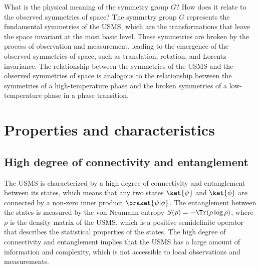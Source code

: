     \begin{tcolorbox}[colback=green!5!white,colframe=green!75!black,title=Question]
        What is the physical meaning of the symmetry group $G$? How does it relate to the observed symmetries of space?
        \tcblower
        The symmetry group $G$ represents the fundamental symmetries of the USMS, which are the transformations that leave the space invariant at the most basic level. These symmetries are broken by the process of observation and measurement, leading to the emergence of the observed symmetries of space, such as translation, rotation, and Lorentz invariance. The relationship between the symmetries of the USMS and the observed symmetries of space is analogous to the relationship between the symmetries of a high-temperature phase and the broken symmetries of a low-temperature phase in a phase transition.
    \end{tcolorbox}

    \section{Properties and characteristics}
    \subsection{High degree of connectivity and entanglement}
    The USMS is characterized by a high degree of connectivity and entanglement between its states, which means that any two states $\ket{\psi}$ and $\ket{\phi}$ are connected by a non-zero inner product $\braket{\psi|\phi}$. The entanglement between the states is measured by the von Neumann entropy $S(\rho) = -\Tr(\rho \log \rho)$, where $\rho$ is the density matrix of the USMS, which is a positive semidefinite operator that describes the statistical properties of the states. The high degree of connectivity and entanglement implies that the USMS has a large amount of information and complexity, which is not accessible to local observations and measurements.

